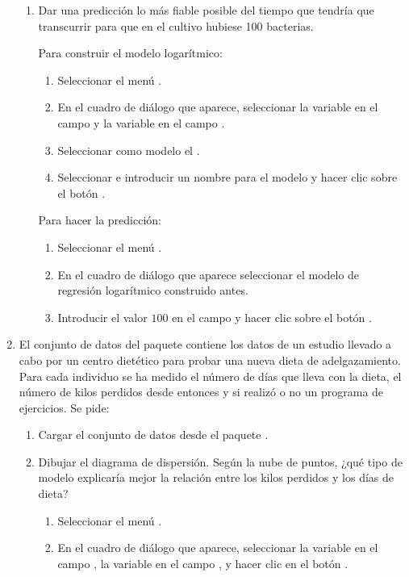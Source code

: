 \begin{enumerate}[leftmargin=*]
\begin{enumerate}
\item Dar una predicción lo más fiable posible del tiempo que tendría que transcurrir para que en el cultivo hubiese 100
bacterias.
\begin{indicacion}{
Para construir el modelo logarítmico:
\begin{enumerate}
\item Seleccionar el menú .
\item En el cuadro de diálogo que aparece, seleccionar la variable  en el campo  y la variable  en el campo .
\item Seleccionar como modelo el .
\item Seleccionar  e introducir un nombre para el modelo y hacer clic sobre el botón .
\end{enumerate}
Para hacer la predicción:
\begin{enumerate}
\item Seleccionar el menú .
\item En el cuadro de diálogo que aparece seleccionar el modelo de regresión logarítmico construido antes.
\item Introducir el valor $100$ en el campo  y hacer clic sobre el botón .
\end{enumerate}}
\end{indicacion}
\end{enumerate}

\item El conjunto de datos  del paquete  contiene los datos de un estudio llevado
a cabo por un centro dietético para probar una nueva dieta de adelgazamiento.
Para cada individuo se ha medido el número de días que lleva con la dieta, el número de kilos perdidos desde entonces y
si realizó o no un programa de ejercicios.
Se pide:
\begin{enumerate}
\item Cargar el conjunto de datos  desde el paquete .

\item Dibujar el diagrama de dispersión. 
Según la nube de puntos, ¿qué tipo de modelo explicaría mejor la relación entre los kilos perdidos y los días de dieta?
\begin{indicacion}{
\begin{enumerate}
\item Seleccionar el menú .
\item En el cuadro de diálogo que aparece, seleccionar la variable  en el campo , la
variable  en el campo , y hacer clic en el botón .
\end{enumerate}}
\end{indicacion}


\end{enumerate}
\end{enumerate}
